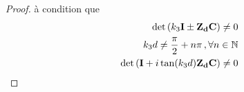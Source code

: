 \begin{proof}
    à condition que 
    \begin{align}
        \det\left(k_3\mathbf{I} \pm \mathbf{Z_d}\mathbf{C} \right) \not = 0 \\
        k_3d\not = \dfrac{\pi}{2}+n\pi\,, \forall n \in \mathbb N \\
        \det\left(\mathbf{I} + i\tan(k_3d)\mathbf{Z_d}\mathbf{C}\right) \not = 0
    \end{align}

\end{proof}



